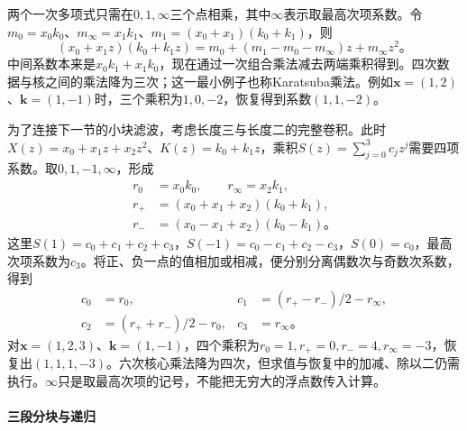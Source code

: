 两个一次多项式只需在$0,1,\infty$三个点相乘，其中$\infty$表示取最高次项系数。令$m_0=x_0k_0$、$m_\infty=x_1k_1$、$m_1=(x_0+x_1)(k_0+k_1)$，则
\begin{equation}
  (x_0+x_1z)(k_0+k_1z)
  =m_0+(m_1-m_0-m_\infty)z+m_\infty z^2\text{。}
  \label{eq:cnn-toom-example}
\end{equation}
中间系数本来是$x_0k_1+x_1k_0$，现在通过一次组合乘法减去两端乘积得到。四次数据与核之间的乘法降为三次；这一最小例子也称Karatsuba乘法。例如$\bm x=(1,2)$、$\bm k=(1,-1)$时，三个乘积为$1,0,-2$，恢复得到系数$(1,1,-2)$。

为了连接下一节的小块滤波，考虑长度三与长度二的完整卷积。此时$X(z)=x_0+x_1z+x_2z^2$、$K(z)=k_0+k_1z$，乘积$S(z)=\sum_{j=0}^3c_jz^j$需要四项系数。取$0,1,-1,\infty$，形成
\begin{equation}
  \begin{aligned}
    r_0&=x_0k_0,\qquad r_\infty=x_2k_1,\\
    r_+&=(x_0+x_1+x_2)(k_0+k_1),\\
    r_-&=(x_0-x_1+x_2)(k_0-k_1)\text{。}
  \end{aligned}
  \label{eq:cnn-toom-three-two-evaluation}
\end{equation}
这里$S(1)=c_0+c_1+c_2+c_3$，$S(-1)=c_0-c_1+c_2-c_3$，$S(0)=c_0$，最高次项系数为$c_3$。将正、负一点的值相加或相减，便分别分离偶数次与奇数次系数，得到
\begin{equation}
  \begin{aligned}
    c_0&=r_0, &c_1&=(r_+-r_-)/2-r_\infty,\\
    c_2&=(r_++r_-)/2-r_0, &c_3&=r_\infty\text{。}
  \end{aligned}
  \label{eq:cnn-toom-three-two-recovery}
\end{equation}
对$\bm x=(1,2,3)$、$\bm k=(1,-1)$，四个乘积为$r_0=1,r_+=0,r_-=4,r_\infty=-3$，恢复出$(1,1,1,-3)$。六次核心乘法降为四次，但求值与恢复中的加减、除以二仍需执行。$\infty$只是取最高次项的记号，不能把无穷大的浮点数传入计算。

\paragraph{三段分块与递归}

